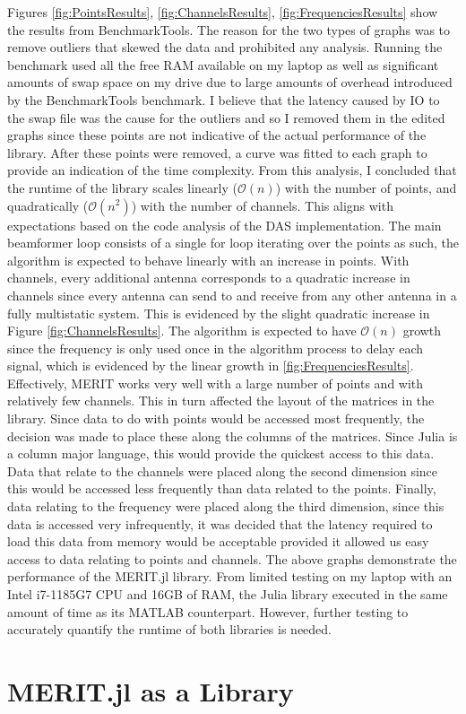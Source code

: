 Figures \ref{fig:PointsResults}, \ref{fig:ChannelsResults}, \ref{fig:FrequenciesResults} show the results
from BenchmarkTools. The reason for the two types of graphs was to remove outliers that skewed the data and prohibited
any analysis. Running the benchmark used all the free RAM available on my laptop as well as significant amounts of swap
space on my drive due to large amounts of overhead introduced by the BenchmarkTools benchmark. I believe that the
latency caused by IO to the swap file was the cause for the outliers and so I removed them in the edited graphs since
these points are not indicative of the actual performance of the library. After these points were removed, a curve was
fitted to each graph to provide an indication of the time complexity. From this analysis, I concluded that the runtime
of the library scales linearly ($\mathcal{O}(n)$) with the number of points, and quadratically ($\mathcal{O}(n^2)$) with
the number of channels. This aligns with expectations based on the code analysis of the DAS implementation. The main
beamformer loop consists of a single for loop iterating over the points as such, the algorithm is expected to behave
linearly with an increase in points. With channels, every additional antenna corresponds to a quadratic increase in
channels since every antenna can send to and receive from any other antenna in a fully multistatic system. This is
evidenced by the slight quadratic increase in Figure \ref{fig:ChannelsResults}. The algorithm is expected to have
$\mathcal{O}(n)$ growth since the frequency is only used once in the algorithm process to delay each signal, which is
evidenced by the linear growth in \ref{fig:FrequenciesResults}. Effectively, MERIT works very well with a large number
of points and with relatively few channels. This in turn affected the layout of the matrices in the library. Since data
to do with points would be accessed most frequently, the decision was made to place these along the columns of the
matrices. Since Julia is a column major language, this would provide the quickest access to this data. Data that relate
to the channels were placed along the second dimension since this would be accessed less frequently than data related to
the points. Finally, data relating to the frequency were placed along the third dimension, since this data is accessed
very infrequently, it was decided that the latency required to load this data from memory would be acceptable provided
it allowed us easy access to data relating to points and channels. The above graphs demonstrate the performance of the
MERIT.jl library. From limited testing on my laptop with an Intel i7-1185G7 CPU and 16GB of RAM, the Julia library
executed in the same amount of time as its MATLAB counterpart. However, further testing to accurately quantify the
runtime of both libraries is needed.

\section{MERIT.jl as a Library}
